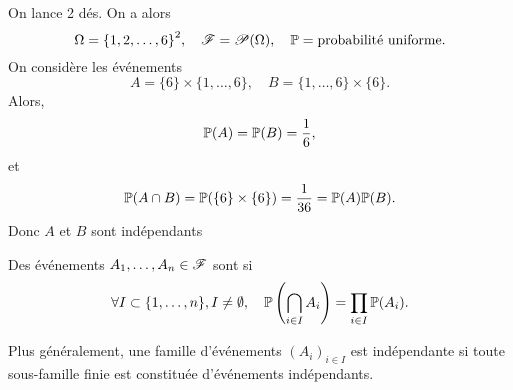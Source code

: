 \begin{example}
    On lance 2 dés. On a alors
    \begin{equation*}
        \Omega = { \{ 1,2,\ldots,6\} }^2, \quad \mathscr{F} = \mathscr{P}(\Omega), \quad \mathbb{P} = \text{probabilité uniforme}.
    \end{equation*}
    On considère les événements
    \begin{equation*}
        A = \{6\}\times \{1,\ldots,6\}, \quad B = \{1,\ldots,6\}\times \{6\}.
    \end{equation*}
    Alors, 
    \begin{equation*}
        \mathbb{P}(A) = \mathbb{P}(B) = \frac{1}{6},
    \end{equation*}
    et
    \begin{equation*}
        \mathbb{P}(A\cap B) = \mathbb{P}(\{6\}\times\{6\}) = \frac{1}{36} = \mathbb{P}(A)\mathbb{P}(B).
    \end{equation*}
    Donc \(A\) et \(B\) sont indépendants
\end{example}

\begin{definition}
    Des événements \(A_1,\ldots,A_n\in \mathscr{F}\) sont 
    si
    \begin{equation*}
        \forall I\subset \{1,\ldots,n\}, I\neq\emptyset, \quad \mathbb{P}\left(\bigcap_{i\in I} A_i\right) = \prod_{i\in I} \mathbb{P}(A_i).
    \end{equation*}

    Plus généralement, une famille d'événements \({(A_i)}_{i\in I}\) est indépendante
    si toute sous-famille finie est constituée d'événements indépendants.
\end{definition}


